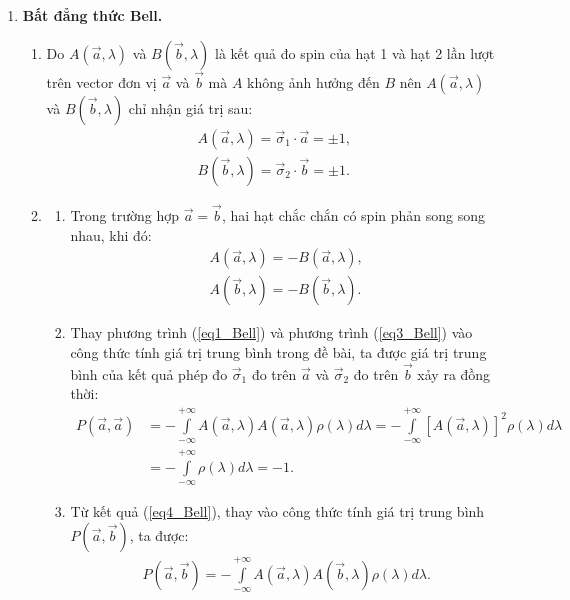 \begin{enumerate}
    \item \textbf{Bất đẳng thức Bell.} \\
    \begin{enumerate}[label=\textbf{\alph*,}]\itemsep0em
        \item Do $A(\Vec{a},\lambda)$ và $B(\Vec{b},\lambda)$ là kết quả đo spin của hạt 1 và hạt 2 lần lượt trên vector đơn vị $\Vec{a}$ và $\Vec{b}$ mà $A$ không ảnh hưởng đến $B$ nên $A(\Vec{a},\lambda)$ và $B(\Vec{b},\lambda)$ chỉ nhận giá trị sau:
\begin{align}
    \label{eq1_Bell}
    A(\Vec{a},\lambda)=\Vec{\sigma}_1\cdot \Vec{a}= \pm 1, \\
    \label{eq2_Bell}
    B(\Vec{b},\lambda)=\Vec{\sigma}_2\cdot \Vec{b}= \pm 1.
\end{align}
    \item \begin{enumerate}
        \item Trong trường hợp $\Vec{a}=\Vec{b}$, hai hạt chắc chắn có spin phản song song nhau, khi đó: 
\begin{align}
    \label{eq3_Bell}
    A(\Vec{a},\lambda)=-B(\Vec{a},\lambda),\\
    \label{eq4_Bell}
    A(\Vec{b},\lambda)=-B(\Vec{b},\lambda).
\end{align}
       \item Thay phương trình (\ref{eq1_Bell}) và phương trình (\ref{eq3_Bell}) vào công thức tính giá trị trung bình trong đề bài, ta được giá trị trung bình của kết quả phép đo $\Vec{\sigma}_1$ đo trên $\Vec{a}$ và $\Vec{\sigma}_2$ đo trên $\Vec{b}$ xảy ra đồng thời:
       \begin{align}
    P(\Vec{a},\Vec{a})&=-\displaystyle\int\limits_{-\infty}^{+\infty}A(\Vec{a},\lambda)A(\Vec{a},\lambda)\rho(\lambda)d\lambda=-\displaystyle\int\limits_{-\infty}^{+\infty}\left[A(\Vec{a},\lambda)\right]^2\rho(\lambda)d\lambda \nonumber \\
    \label{eq5_Bell}
    &=-\displaystyle\int\limits_{-\infty}^{+\infty}\rho(\lambda)d\lambda=-1.
\end{align}
        \item Từ kết quả (\ref{eq4_Bell}), thay vào công thức tính giá trị trung bình $P(\Vec{a},\Vec{b})$, ta được:
\begin{align} \label{eq6_Bell}
    P(\Vec{a},\Vec{b})=-\displaystyle\int\limits_{-\infty}^{+\infty}A(\Vec{a},\lambda)A(\Vec{b},\lambda)\rho(\lambda)d\lambda.
\end{align}

\end{enumerate}
\end{enumerate}
\end{enumerate}
